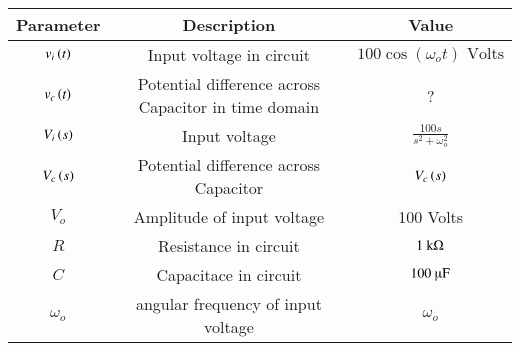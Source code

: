 \begin{tabular}{|c|c|c|}
    \hline
    \textbf{Parameter} & \textbf{Description} & \textbf{Value} \\
    \hline
    $ v_i\left(t\right)$ & Input voltage in circuit & $ 100 \cos{(\omega_o t)}\text{ Volts}$ \\
    \hline
    $v_c\left(t\right)$ & Potential difference across Capacitor in time domain & ? \\
    \hline
    $V_i\left(s\right)$ & Input voltage & $ \frac{100s}{s^2+ \omega_o^2}$\\
    \hline
    $V_c\left(s\right)$ & Potential difference across Capacitor & $V_c\left(s\right)$ \\
    \hline
    $ V_o$ & Amplitude of input voltage & 100 Volts\\
    \hline
    $R$ & Resistance in circuit & $ 1\text{ k\ohm}$ \\
    \hline
    $C$ & Capacitace in circuit & $ 100 \text{ \micro F}$ \\
    \hline
    $\omega_o$ & angular frequency of input voltage& $ \omega_o$\\
    \hline
\end{tabular}




